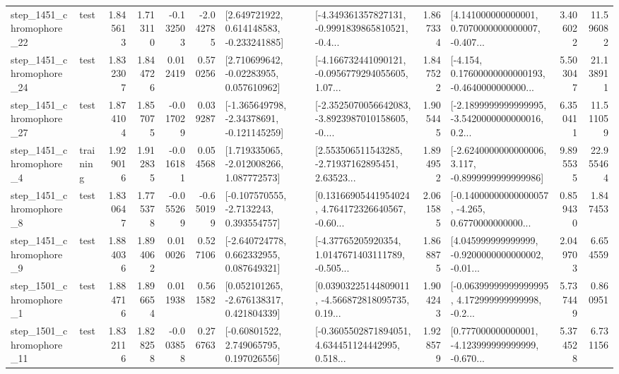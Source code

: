 \begin{tabular}{llrrrrllrlrr}
 step\_1451\_chromophore\_22 &      test &      1.845613 &    1.713110 &     -0.132503 & -2.042785 &    [2.649721922, 0.614148583, -0.233241885] &  [-4.349361357827131, -0.9991839865810521, -0.4... &       1.867334 &  [4.141000000000001, 0.7070000000000007, -0.407... &            3.406022 &         11.596082 \\
 step\_1451\_chromophore\_24 &      test &      1.832307 &    1.844726 &      0.012419 &  0.570256 &     [2.710699642, -0.02283955, 0.057610962] &  [-4.166732441090121, -0.0956779294055605, 1.07... &       1.847522 &  [-4.154, 0.17600000000000193, -0.4640000000000... &            5.503047 &         21.138911 \\
 step\_1451\_chromophore\_27 &      test &      1.874104 &    1.857075 &     -0.017029 &  0.039287 &   [-1.365649798, -2.34378691, -0.121145259] &  [-2.3525070056642083, -3.8923987010158605, -0.... &       1.905445 &  [-2.1899999999999995, -3.5420000000000016, 0.2... &            6.350411 &         11.511059 \\
  step\_1451\_chromophore\_4 &  training &      1.929016 &    1.912835 &     -0.016181 &  0.054568 &    [1.719335065, -2.012008266, 1.087772573] &  [2.553506511543285, -2.71937162895451, 2.63523... &       1.894952 &  [-2.6240000000000006, 3.117, -0.8999999999999986] &            9.895535 &         22.955464 \\
  step\_1451\_chromophore\_8 &      test &      1.830647 &    1.775378 &     -0.055269 & -0.650199 &     [-0.107570555, -2.7132243, 0.393554757] &  [0.13166905441954024, 4.764172326640567, -0.60... &       2.061585 &  [-0.14000000000000057, -4.265, 0.6770000000000... &            0.859430 &          1.847453 \\
  step\_1451\_chromophore\_9 &      test &      1.884036 &    1.894062 &      0.010026 &  0.527106 &    [-2.640724778, 0.662332955, 0.087649321] &  [-4.37765205920354, 1.0147671403111789, -0.505... &       1.868875 &  [4.045999999999999, -0.9200000000000002, -0.01... &            2.049703 &          6.654559 \\
  step\_1501\_chromophore\_1 &      test &      1.884716 &    1.896654 &      0.011938 &  0.561582 &    [0.052101265, -2.676138317, 0.421804339] &  [0.03903225144809011, -4.566872818095735, 0.19... &       1.904243 &  [-0.06399999999999995, 4.172999999999998, -0.2... &            5.737449 &          0.860951 \\
 step\_1501\_chromophore\_11 &      test &      1.832116 &    1.828258 &     -0.003858 &  0.276763 &     [-0.60801522, 2.749065795, 0.197026556] &  [-0.3605502871894051, 4.634451124442995, 0.518... &       1.928579 &  [0.777000000000001, -4.123999999999999, -0.670... &            5.374528 &          6.731156 \\

\end{tabular}
